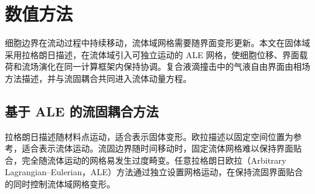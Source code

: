 \section{数值方法}
\label{sec:ch2_numerical_method}

细胞边界在流动过程中持续移动，流体域网格需要随界面变形更新。本文在固体域采用拉格朗日描述，在流体域引入可独立运动的 ALE 网格，使细胞位移、界面载荷和流场演化在同一计算框架内保持协调。复合液滴撞击中的气液自由界面由相场方法描述，并与流固耦合共同进入流体动量方程。

\subsection{基于 ALE 的流固耦合方法}
\label{subsec:ch2_ale}

拉格朗日描述随材料点运动，适合表示固体变形。欧拉描述以固定空间位置为参考，适合表示流体运动。流固边界随时间移动时，固定流体网格难以保持界面贴合，完全随流体运动的网格易发生过度畸变。任意拉格朗日欧拉（Arbitrary Lagrangian--Eulerian，ALE）方法通过独立设置网格运动，在保持流固界面贴合的同时控制流体域网格变形\cite{hirt1974ale,hughes1981ale,donea2004ale}。

